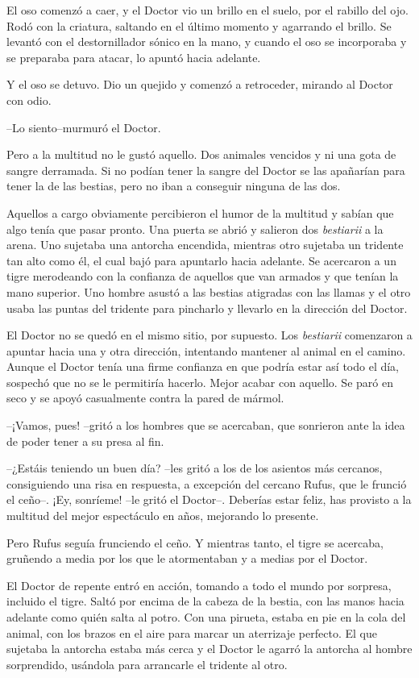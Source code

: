 El oso comenzó a caer, y el Doctor vio un brillo en el suelo, por el
rabillo del ojo. Rodó con la criatura, saltando en el último momento y
agarrando el brillo. Se levantó con el destornillador sónico en la mano,
y cuando el oso se incorporaba y se preparaba para atacar, lo apuntó
hacia adelante.

Y el oso se detuvo. Dio un quejido y comenzó a retroceder, mirando al
Doctor con odio.

--Lo siento--murmuró el Doctor.

Pero a la multitud no le gustó aquello. Dos animales vencidos y ni una
gota de sangre derramada. Si no podían tener la sangre del Doctor se las
apañarían para tener la de las bestias, pero no iban a conseguir ninguna
de las dos.

Aquellos a cargo obviamente percibieron el humor de la multitud y sabían
que algo tenía que pasar pronto. Una puerta se abrió y salieron dos
\emph{bestiarii} a la arena. Uno sujetaba una antorcha encendida,
mientras otro sujetaba un tridente tan alto como él, el cual bajó para
apuntarlo hacia adelante. Se acercaron a un tigre merodeando con la
confianza de aquellos que van armados y que tenían la mano superior. Uno
hombre asustó a las bestias atigradas con las llamas y el otro usaba las
puntas del tridente para pincharlo y llevarlo en la dirección del
Doctor.

El Doctor no se quedó en el mismo sitio, por supuesto. Los
\emph{bestiarii} comenzaron a apuntar hacia una y otra dirección,
intentando mantener al animal en el camino. Aunque el Doctor tenía una
firme confianza en que podría estar así todo el día, sospechó que no se
le permitiría hacerlo. Mejor acabar con aquello. Se paró en seco y se
apoyó casualmente contra la pared de mármol.

--¡Vamos, pues! --gritó a los hombres que se acercaban, que sonrieron
ante la idea de poder tener a su presa al fin.

--¿Estáis teniendo un buen día? --les gritó a los de los asientos más
cercanos, consiguiendo una risa en respuesta, a excepción del cercano
Rufus, que le frunció el ceño--. ¡Ey, sonríeme! --le gritó el Doctor--.
Deberías estar feliz, has provisto a la multitud del mejor espectáculo
en años, mejorando lo presente.

Pero Rufus seguía frunciendo el ceño. Y mientras tanto, el tigre se
acercaba, gruñendo a media por los que le atormentaban y a medias por el
Doctor.

El Doctor de repente entró en acción, tomando a todo el mundo por
sorpresa, incluido el tigre. Saltó por encima de la cabeza de la bestia,
con las manos hacia adelante como quién salta al potro. Con una pirueta,
estaba en pie en la cola del animal, con los brazos en el aire para
marcar un aterrizaje perfecto. El que sujetaba la antorcha estaba más
cerca y el Doctor le agarró la antorcha al hombre sorprendido, usándola
para arrancarle el tridente al otro.

